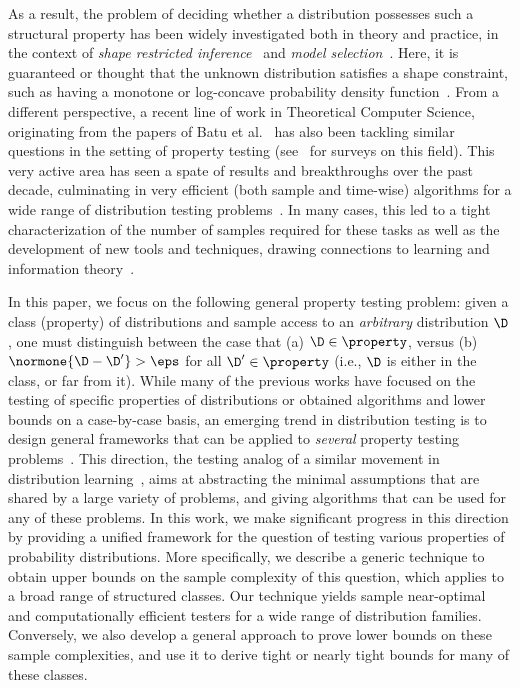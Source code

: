 As a result, the problem of deciding whether a distribution possesses such a structural property has been widely investigated both in theory and practice, in the context of \emph{shape restricted inference}~\cite{BBBB:72,SS:01} and \emph{model selection}~\cite{MP:03}. Here, it is guaranteed or thought that the unknown distribution satisfies a shape constraint, such as having a monotone or log-concave probability density function~\cite{SN:99,BB:05,Wal:09,Diakonikolas:CRC}.
From a different perspective, a recent line of work in Theoretical Computer Science, originating from the papers of Batu et al.~\cite{BFRSW:00,BFFKRW:01,GRexp:00} has also been tackling similar questions in the setting of property testing (see~\cite{Ron:08,Ron:10,Rubinfeld:12:Taming,Canonne:15:BlueData} for surveys on this field). This very active area has seen a spate of results and breakthroughs over the past decade, culminating in very efficient (both sample and time-wise) algorithms for a wide range of distribution testing problems~\cite{BDKR:05,GMV:06,Alon:2007,DDSV:13,CDVV:14,AD:15,DKN:15}. In many cases, this led to a tight characterization of the number of samples required for these tasks as well as the development of new tools and techniques, drawing connections to learning and information theory~\cite{ValiantValiant:10lb,VV:11:stoc,VV:14,DK:16}.

In this paper, we focus on the following general property testing problem: given a class (property) of distributions \property and sample access to an \emph{arbitrary} distribution $\D$, one must distinguish between the case that \textsf{(a)} $\D\in\property$, versus \textsf{(b)} $\normone{\D-\D^\prime} >\eps$ for all $\D^\prime\in\property$ (i.e., $\D$ is either in the class, or far from it). While many of the previous works have focused on the testing of specific properties of distributions or obtained algorithms and lower bounds on a case-by-case basis, an emerging trend in distribution testing is to design general frameworks that can be applied to \emph{several} property testing problems~\cite{Valiant:11,VV:11:stoc, DKN:15, DKN:15:FOCS}. This direction, the testing analog of a similar movement in distribution learning~\cite{CDSS:13,CDSS:14:NIPS,CDSS:14,ADLS:15}, aims at abstracting the minimal assumptions that are shared by a large variety of problems, and giving algorithms that can be used for any of these problems. In this work, we make significant progress in this direction by providing a unified framework for the question of testing various properties of probability distributions. More specifically, we describe a generic technique to obtain upper bounds on the sample complexity of this question, which applies to a broad range of structured classes. Our technique yields sample near-optimal and computationally efficient testers for a wide range of distribution families. Conversely, we also develop a general approach to prove lower bounds on these sample complexities, and use it to derive tight or nearly tight bounds for many of these classes.

